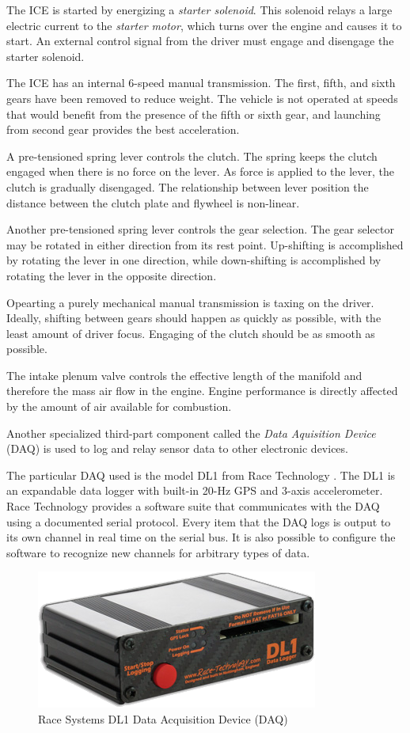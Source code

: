 The ICE is started by energizing a \emph{starter solenoid}. This solenoid relays a large electric 
current to the \emph{starter motor}, which turns over the engine and causes it to start. An 
external control signal from the driver must engage and disengage the starter solenoid.

The ICE has an internal 6-speed manual transmission. The first, fifth, and sixth gears have been 
removed to reduce weight. The vehicle is not operated at speeds that would benefit from the presence 
of the fifth or sixth gear, and launching from second gear provides the best acceleration. 

A pre-tensioned spring lever controls the clutch. The spring keeps the clutch engaged when there is 
no force on the lever. As force is applied to the lever, the clutch is gradually disengaged. The 
relationship between lever position the distance between the clutch plate and flywheel is non-linear. 

Another pre-tensioned spring lever controls the gear selection. The gear selector may be rotated in 
either direction from its rest point. Up-shifting is accomplished by rotating the lever in one 
direction, while down-shifting is accomplished by rotating the lever in the opposite direction. 

Opearting a purely mechanical manual transmission is taxing on the driver. Ideally, shifting
between gears should happen as quickly as possible, with the least amount of driver focus. 
Engaging of the clutch should be as smooth as possible. 

The intake plenum valve controls the effective length of the manifold and therefore the mass air
flow in the engine. Engine performance is directly affected by the amount of air available for
combustion. 

Another specialized third-part component called the \emph{Data Aquisition Device} (DAQ) is used
to log and relay sensor data to other electronic devices.

The particular DAQ used is the model DL1 from Race Technology \cite{DL1Dsheet}. The DL1 is an 
expandable data logger with built-in 20-Hz GPS and 3-axis accelerometer. Race Technology provides 
a software suite that communicates with the DAQ using a documented serial protocol. Every item that 
the DAQ logs is output to its own channel in real time on the serial bus. It is also possible to 
configure the software to recognize new channels for arbitrary types of data. 

\begin{figure}[H]
	\centering
	 	\includegraphics[scale=0.5]{figures/dl1.png}
    \caption{Race Systems DL1 Data Acquisition Device (DAQ)}
    \label{fig:dl1_product}
\end{figure}

